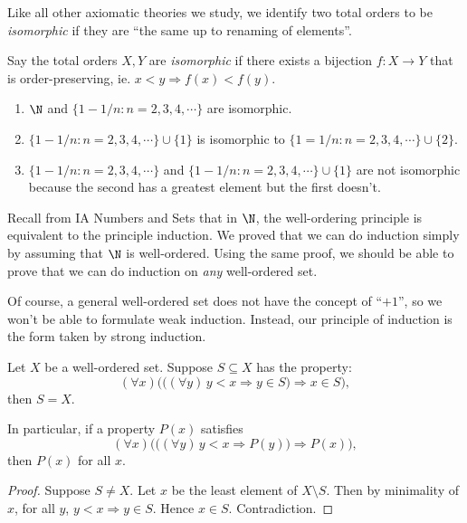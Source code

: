 \documentclass[a4paper]{article}
\begin{document}
Like all other axiomatic theories we study, we identify two total orders to be \emph{isomorphic} if they are ``the same up to renaming of elements''.
\begin{defi}
  Say the total orders $X, Y$ are \emph{isomorphic} if there exists a bijection $f: X\to Y$ that is order-preserving, ie. $x < y \Rightarrow  f(x) < f(y)$.
\end{defi}

\begin{eg}\leavevmode
\begin{enumerate}
  \item $\N$ and $\{1 - 1/n: n = 2, 3, 4, \cdots\}$ are isomorphic.
  \item $\{1 - 1/n:n = 2, 3, 4, \cdots\}\cup \{1\}$ is isomorphic to $\{1 = 1/n: n = 2, 3, 4, \cdots\} \cup \{2\}$.
  \item $\{1 - 1/n: n = 2, 3, 4, \cdots\}$ and $\{1 - 1/n: n = 2, 3, 4, \cdots\}\cup \{1\}$ are not isomorphic because the second has a greatest element but the first doesn't.
\end{enumerate}
\end{eg}

Recall from IA Numbers and Sets that in $\N$, the well-ordering principle is equivalent to the principle induction. We proved that we can do induction simply by assuming that $\N$ is well-ordered. Using the same proof, we should be able to prove that we can do induction on \emph{any} well-ordered set.

Of course, a general well-ordered set does not have the concept of ``$+1$'', so we won't be able to formulate weak induction. Instead, our principle of induction is the form taken by strong induction.
\begin{prop}
  Let $X$ be a well-ordered set. Suppose $S \subseteq X$ has the property:
  \[
    (\forall x)\Big(\big((\forall y)\, y < x \Rightarrow y\in S\big) \Rightarrow x\in S\Big),
  \]
  then $S = X$.

  In particular, if a property $P(x)$ satisfies
  \[
    (\forall x)\Big(\big((\forall y)\, y < x \Rightarrow P(y)\big)\Rightarrow P(x)\Big),
  \]
  then $P(x)$ for all $x$.
\end{prop}

\begin{proof}
  Suppose $S\not=X$. Let $x$ be the least element of $X\setminus S$. Then by minimality of $x$, for all $y$, $y < x \Rightarrow y\in S$. Hence $x\in S$. Contradiction.
\end{proof}
\end{document}

